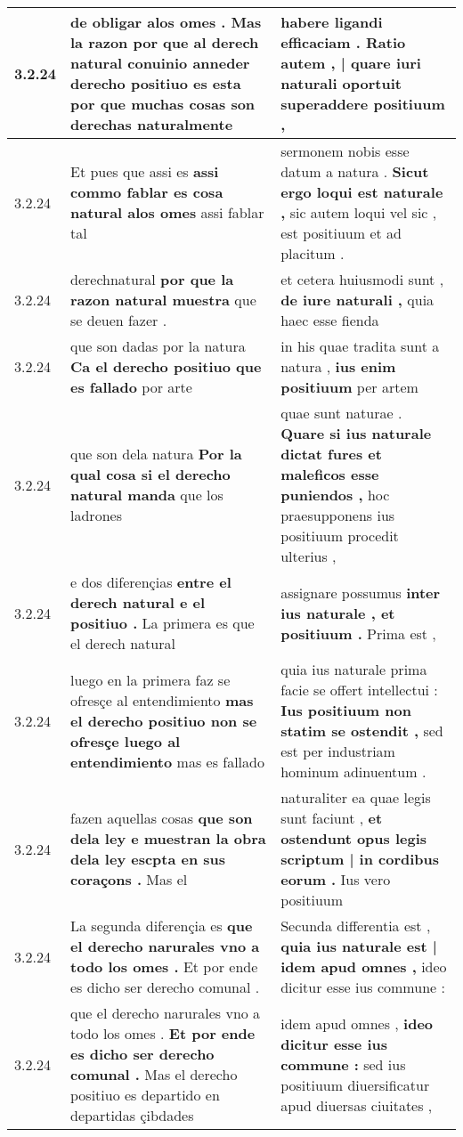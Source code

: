 \begin{tabular}{|p{1cm}|p{6.5cm}|p{6.5cm}|}
3.2.24 & de obligar alos omes . \textbf{ Mas la razon por que al derech natural conuinio anneder derecho positiuo es esta } por que muchas cosas son derechas naturalmente & habere ligandi efficaciam . \textbf{ Ratio autem , | quare iuri naturali oportuit } superaddere positiuum , \\\hline
3.2.24 & Et pues que assi es \textbf{ assi commo fablar es cosa natural alos omes } assi fablar tal & sermonem nobis esse datum a natura . \textbf{ Sicut ergo loqui est naturale , } sic autem loqui vel sic , est positiuum et ad placitum . \\\hline
3.2.24 & derechnatural \textbf{ por que la razon natural muestra } que se deuen fazer . & et cetera huiusmodi sunt , \textbf{ de iure naturali , } quia haec esse fienda \\\hline
3.2.24 & que son dadas por la natura \textbf{ Ca el derecho positiuo que es fallado } por arte & in his quae tradita sunt a natura , \textbf{ ius enim positiuum } per artem \\\hline
3.2.24 & que son dela natura \textbf{ Por la qual cosa si el derecho natural manda } que los ladrones & quae sunt naturae . \textbf{ Quare si ius naturale dictat fures et maleficos esse puniendos , } hoc praesupponens ius positiuum procedit ulterius , \\\hline
3.2.24 & e dos diferençias \textbf{ entre el derech natural e el positiuo . } La primera es que el derech natural & assignare possumus \textbf{ inter ius naturale , et positiuum . } Prima est , \\\hline
3.2.24 & luego en la primera faz se ofresçe al entendimiento \textbf{ mas el derecho positiuo non se ofresçe luego al entendimiento } mas es fallado & quia ius naturale prima facie se offert intellectui : \textbf{ Ius positiuum non statim se ostendit , } sed est per industriam hominum adinuentum . \\\hline
3.2.24 & fazen aquellas cosas \textbf{ que son dela ley e muestran la obra dela ley escpta en sus coraçons . } Mas el & naturaliter ea quae legis sunt faciunt , \textbf{ et ostendunt opus legis scriptum | in cordibus eorum . } Ius vero positiuum \\\hline
3.2.24 & La segunda diferençia es \textbf{ que el derecho narurales vno a todo los omes . } Et por ende es dicho ser derecho comunal . & Secunda differentia est , \textbf{ quia ius naturale est | idem apud omnes , } ideo dicitur esse ius commune : \\\hline
3.2.24 & que el derecho narurales vno a todo los omes . \textbf{ Et por ende es dicho ser derecho comunal . } Mas el derecho positiuo es departido en departidas çibdades & idem apud omnes , \textbf{ ideo dicitur esse ius commune : } sed ius positiuum diuersificatur apud diuersas ciuitates , \\\hline

\end{tabular}
